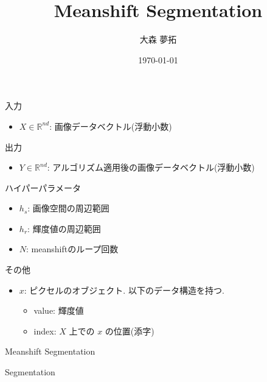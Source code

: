 \documentclass[a4paper]{ujarticle} %
\title{Meanshift Segmentation} %
\date{\today}
\author{大森 夢拓}
\begin{document}
	入力
	\begin{itemize}
		\item $X \in \mathbb{R}^{nd}$: 画像データベクトル(浮動小数)
	\end{itemize}
	出力
	\begin{itemize}
		\item $Y \in \mathbb{R}^{nd}$: アルゴリズム適用後の画像データベクトル(浮動小数)
	\end{itemize}
	ハイパーパラメータ
	\begin{itemize}
		\item $h_s$: 画像空間の周辺範囲
		\item $h_r$: 輝度値の周辺範囲
		\item $N$: meanshiftのループ回数
	\end{itemize}
	その他
	\begin{itemize}
		\item $x$: ピクセルのオブジェクト. 以下のデータ構造を持つ.
		\begin{itemize}
			\item value: 輝度値
			\item index: $X$ 上での $x$ の位置(添字)
		\end{itemize}
	\end{itemize}

	\begin{algorithm}[H]
		\caption{Meanshift Segmentation}
		\label{alg:mss}
		\begin{algorithmic}[1]
			\EndFunction
		\end{algorithmic}
	\end{algorithm}
	
	\begin{algorithm}[H]
		\caption{Segmentation}
		\label{alg:s}
		\begin{algorithmic}[1]
					 
				\EndFor
			\EndFunction
		\end{algorithmic}
	\end{algorithm}
\end{document}
